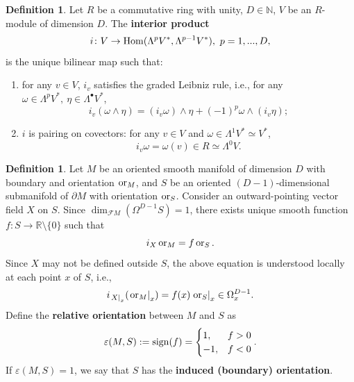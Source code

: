 \documentclass{elsarticle}
\theoremstyle{definition}
\newtheorem{definition}[theorem]{Definition}
\newcommand{\Hom}{\mathop{\rm Hom}\nolimits}
\newcommand{\OR}{\mathop{\rm or}\nolimits}
\newcommand{\N}{\mathbb{N}}
\newcommand{\R}{\mathbb{R}}
\newcommand{\restrict}[2]{\left.#1\right|_{#2}}
\newcommand{\newterm}[1]{\textbf{#1}}
\begin{document}
\begin{definition}
  Let $R$ be a commutative ring with unity,
  $D \in \N$,
  $V$ be an $R$-module of dimension $D$.
  The \newterm{interior product}
  \begin{equation}
    i \colon V \to \Hom(\Lambda^p V^*, \Lambda^{p - 1} V^*),\ p = 1, ..., D,
  \end{equation}
  is the unique bilinear map such that:
  \begin{enumerate}
    \item
      for any $v \in V$, $i_v$ satisfies the graded Leibniz rule, i.e.,
      for any $\omega \in \Lambda^p V^*,\ \eta \in \Lambda^\bullet V^*$,
      \begin{equation}
        i_v(\omega \wedge \eta) = (i_v \omega) \wedge \eta + (-1)^p \omega \wedge (i_v \eta);
      \end{equation}
    \item
      $i$ is pairing on covectors: for any $v \in V$ and $\omega \in \Lambda^1 V^* \simeq V^*$,
      \begin{equation}
        i_v \omega = \omega(v) \in R \simeq \Lambda^0 V.
      \end{equation}
  \end{enumerate}
\end{definition}
\begin{definition}
  \label{def:exterior_calculus/relative_orientations}
  Let $M$ be an oriented smooth manifold of dimension $D$ with boundary and orientation $\OR_M$, and $S$ be an oriented $(D - 1)$-dimensional submanifold of $\partial M$ with orientation $\OR_S$.
  Consider an outward-pointing vector field $X$ on $S$.
  Since $\dim_{\mathcal{F} M}(\Omega^{D - 1} S) = 1$, there exists unique smooth function $f \colon S \to \R \setminus \{0\}$ such that
  \begin{equation}
    i_X \OR_M = f \OR_S.
  \end{equation}
  Since $X$ may not be defined outside $S$, the above equation is understood locally at each point $x$ of $S$, i.e.,
  \begin{equation}
    i_{\restrict{X}{x}}(\restrict{\OR_M}{x}) = f(x) \restrict{\OR_S}{x} \in \Omega^{D - 1}_x.
  \end{equation}
  Define the \newterm{relative orientation} between $M$ and $S$ as
  \begin{equation}
    \varepsilon(M, S) := {\rm sign}(f) =
    \begin{cases}
      1, & f > 0 \\
      -1, & f < 0
    \end{cases}.
  \end{equation}
  If $\varepsilon(M, S) = 1$, we say that $S$ has the \newterm{induced (boundary) orientation}.
\end{definition}
\end{document}
